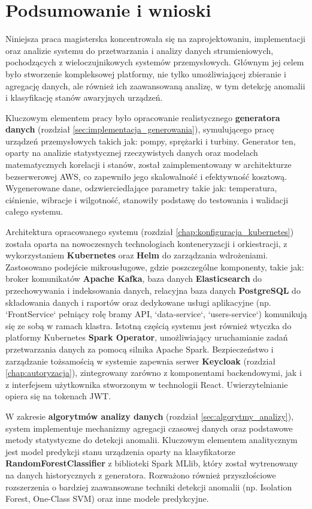 \section{Podsumowanie i wnioski}
\label{sec:podsumowanie_wnioski}

Niniejsza praca magisterska koncentrowała się na zaprojektowaniu, implementacji oraz analizie systemu do przetwarzania i analizy danych strumieniowych, pochodzących z wieloczujnikowych systemów przemysłowych. Głównym jej celem było stworzenie kompleksowej platformy, nie tylko umożliwiającej zbieranie i agregację danych, ale również ich zaawansowaną analizę, w tym detekcję anomalii i klasyfikację stanów awaryjnych urządzeń.

Kluczowym elementem pracy było opracowanie realistycznego \textbf{generatora danych} (rozdział \ref{sec:implementacja_generowania}), symulującego pracę urządzeń przemysłowych takich jak: pompy, sprężarki i turbiny. Generator ten, oparty na analizie statystycznej rzeczywistych danych oraz modelach matematycznych korelacji i stanów, został zaimplementowany w architekturze bezserwerowej AWS, co zapewniło jego skalowalność i efektywność kosztową. Wygenerowane dane, odzwierciedlające parametry takie jak: temperatura, ciśnienie, wibracje i wilgotność, stanowiły podstawę do testowania i walidacji całego systemu.

Architektura opracowanego systemu (rozdział \ref{chap:konfiguracja_kubernetes}) została oparta na nowoczesnych technologiach konteneryzacji i orkiestracji, z wykorzystaniem \textbf{Kubernetes} oraz \textbf{Helm} do zarządzania wdrożeniami. Zastosowano podejście mikrousługowe, gdzie poszczególne komponenty, takie jak: broker komunikatów \textbf{Apache Kafka}, baza danych \textbf{Elasticsearch} do przechowywania i indeksowania danych, relacyjna baza danych \textbf{PostgreSQL} do składowania danych i raportów oraz dedykowane usługi aplikacyjne (np. `FrontService` pełniący rolę bramy API, `data-service`, `users-service`) komunikują się ze sobą w ramach klastra. Istotną częścią systemu jest również wtyczka do platformy Kubernetes \textbf{Spark Operator}, umożliwiający uruchamianie zadań przetwarzania danych za pomocą silnika Apache Spark. Bezpieczeństwo i zarządzanie tożsamością w systemie zapewnia serwer \textbf{Keycloak} (rozdział \ref{chap:autoryzacja}), zintegrowany zarówno z komponentami backendowymi, jak i z interfejsem użytkownika stworzonym w technologii React. Uwierzytelnianie opiera się na tokenach JWT.

W zakresie \textbf{algorytmów analizy danych} (rozdział \ref{sec:algorytmy_analizy}), system implementuje mechanizmy agregacji czasowej danych oraz podstawowe metody statystyczne do detekcji anomalii. Kluczowym elementem analitycznym jest model predykcji stanu urządzenia oparty na klasyfikatorze \textbf{RandomForestClassifier} z biblioteki Spark MLlib, który został wytrenowany na danych historycznych z generatora. Rozważono również przyszłościowe rozszerzenia o bardziej zaawansowane techniki detekcji anomalii (np. Isolation Forest, One-Class SVM) oraz inne modele predykcyjne.

